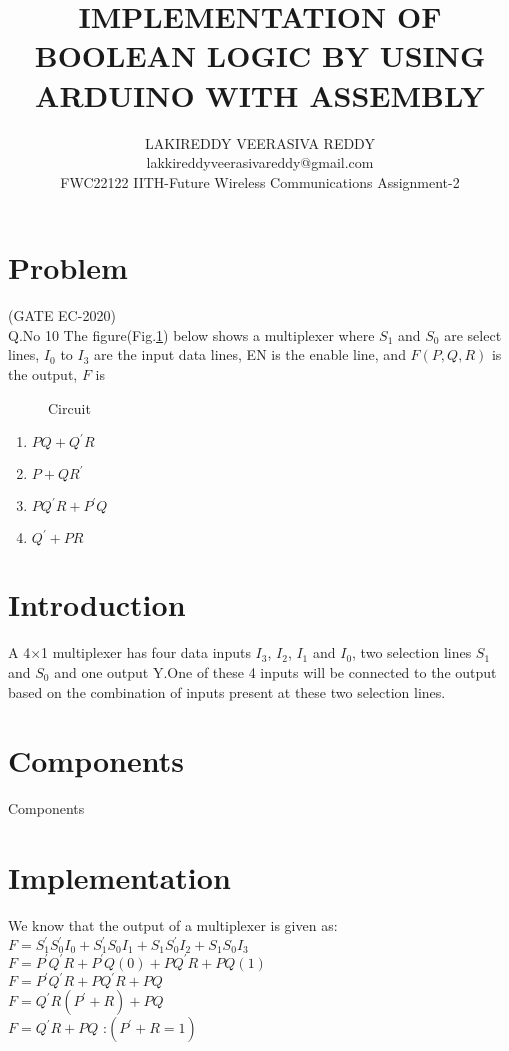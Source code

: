 \documentclass{article}
\title{IMPLEMENTATION OF BOOLEAN LOGIC BY USING ARDUINO WITH ASSEMBLY}
\author{LAKIREDDY VEERASIVA REDDY\\lakkireddyveerasivareddy@gmail.com\\FWC22122 IITH-Future Wireless Communications Assignment-2}
\date{}
\begin{document}
\maketitle
\tableofcontents
\pagebreak

\section{Problem}                               
(GATE EC-2020)\\                                  
Q.No 10    The figure(Fig.\ref{fig:Circuit}) below shows a multiplexer where $S_1$ and $S_0$ are select lines, $I_0$ to $I_3$ are the input data lines, EN is the enable line, and $F(P,Q,R)$ is the output, $F$ is
\begin{figure}[!h]
\begin{center}

\end{center}
\caption{Circuit}
\label{fig:Circuit}
\end{figure}

\begin{enumerate}
   \item $PQ +{Q^\prime} R$
   \item $P+Q {R^\prime}$
   \item $P{Q^\prime} R+{P^\prime}Q$
   \item ${Q^\prime} +PR$
\end{enumerate}

\section{Introduction}
A 4×1 multiplexer has four data inputs $I_3$, $I_2$, $I_1$ and $I_0$, two selection lines $S_1$ and $S_0$ and one output Y.One of these 4 inputs will be connected to the output based on the combination of inputs present at these two selection lines. 

\section{Components}
\begin{table}[!h]
\centering

\caption{Components}
\label{table:Components}
\end{table}

\section{Implementation}
We know that the output of a multiplexer is given as: \\
$F=S_1^\prime S_0^\prime I_0+S_1^\prime S_0I_1+S_1S_0^\prime I_2+S_1S_0I_3$ \\ 
$F=P^\prime Q^\prime R+P^\prime Q(0)+PQ^\prime R+PQ(1)$ \\
$F=P^\prime Q^\prime R+PQ^\prime R+PQ$ \\
$F=Q^\prime R(P^\prime +R) +PQ$ \\
$F=Q^\prime R+PQ$     :$(P^\prime +R=1)$
\end{document}
